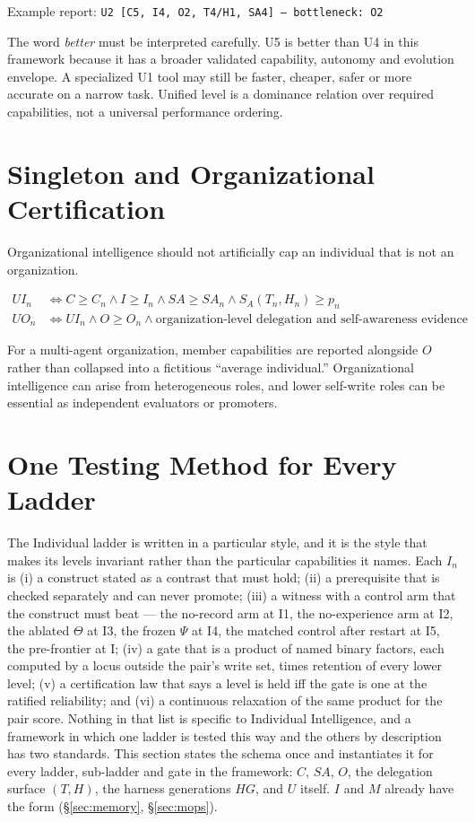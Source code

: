 \begin{center}
Example report: \texttt{U2 [C5, I4, O2, T4/H1, SA4] --- bottleneck: O2}
\end{center}

The word \emph{better} must be interpreted carefully. U5 is better than U4 in this framework because it has a broader validated capability, autonomy and evolution envelope. A specialized U1 tool may still be faster, cheaper, safer or more accurate on a narrow task. Unified level is a dominance relation over required capabilities, not a universal performance ordering.

\section{Singleton and Organizational Certification}

Organizational intelligence should not artificially cap an individual that is not an organization.

\begin{align}
UI_n &\iff C \ge C_n \wedge I \ge I_n \wedge SA \ge SA_n \wedge S_A(T_n,H_n) \ge p_n\\
UO_n &\iff UI_n \wedge O \ge O_n \wedge \text{organization-level delegation and self-awareness evidence}
\end{align}

For a multi-agent organization, member capabilities are reported alongside $O$ rather than collapsed into a fictitious ``average individual.'' Organizational intelligence can arise from heterogeneous roles, and lower self-write roles can be essential as independent evaluators or promoters.

\section{One Testing Method for Every Ladder}\label{sec:onestyle}

The Individual ladder is written in a particular style, and it is the style that makes its levels invariant rather than the particular capabilities it names. Each $I_n$ is (i) a construct stated as a contrast that must hold; (ii) a prerequisite that is checked separately and can never promote; (iii) a witness with a control arm that the construct must beat --- the no-record arm at I1, the no-experience arm at I2, the ablated $\Theta$ at I3, the frozen $\Psi$ at I4, the matched control after restart at I5, the pre-frontier at I\Om{}; (iv) a gate that is a product of named binary factors, each computed by a locus outside the pair's write set, times retention of every lower level; (v) a certification law that says a level is held iff the gate is one at the ratified reliability; and (vi) a continuous relaxation of the same product for the pair score. Nothing in that list is specific to Individual Intelligence, and a framework in which one ladder is tested this way and the others by description has two standards. This section states the schema once and instantiates it for every ladder, sub-ladder and gate in the framework: $C$, $SA$, $O$, the delegation surface $(T, H)$, the harness generations $HG$, and $U$ itself. $I$ and $M$ already have the form (\S\ref{sec:memory}, \S\ref{sec:mops}).

